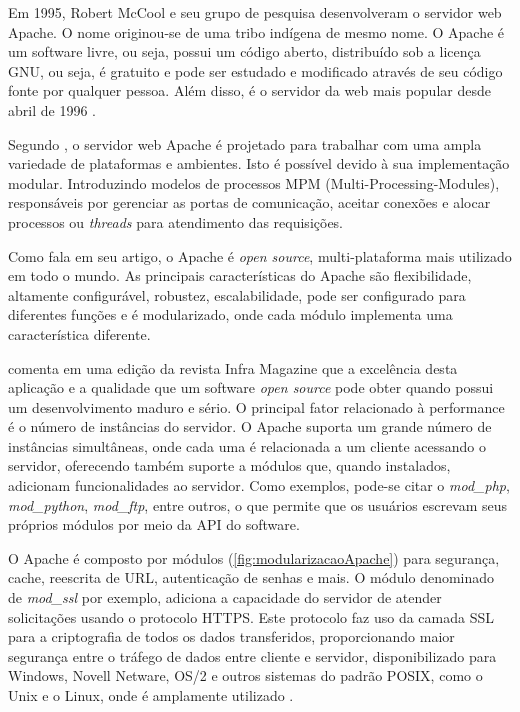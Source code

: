 Em 1995, Robert McCool e seu grupo de pesquisa desenvolveram o servidor web Apache. O nome originou-se de uma tribo indígena de mesmo nome. O Apache é um software livre, ou seja, possui um código aberto, distribuído sob a licença GNU, ou seja, é gratuito e pode ser estudado e modificado através de seu código fonte por qualquer pessoa. Além disso, é o servidor da web mais popular desde abril de 1996 \cite{netcraft}.

Segundo , o servidor web Apache é projetado para trabalhar com uma ampla variedade de plataformas e ambientes. Isto é possível devido à sua implementação  modular. Introduzindo modelos de processos MPM (Multi-Processing-Modules), responsáveis por gerenciar as portas de comunicação, aceitar conexões e alocar processos ou \textit{threads} para atendimento das requisições.

Como  fala em seu artigo, o Apache é \textit{open source}, multi-plataforma mais utilizado em todo o mundo. As principais características do Apache são flexibilidade, altamente configurável, robustez, escalabilidade, pode ser configurado para diferentes funções e é modularizado, onde cada módulo implementa uma característica diferente.

 comenta em uma edição da revista Infra Magazine que a excelência desta aplicação e a qualidade que um software \textit{open source} pode obter quando possui um desenvolvimento maduro e sério. O principal fator relacionado à performance é o número de instâncias do servidor. O Apache suporta um grande número de instâncias simultâneas, onde cada uma é relacionada a um cliente acessando o servidor, oferecendo também suporte a módulos que, quando instalados, adicionam funcionalidades ao servidor. Como exemplos, pode-se citar o \textit{mod\_php}, \textit{mod\_python}, \textit{mod\_ftp}, entre outros, o que permite que os usuários escrevam seus próprios módulos por meio da API do software.

O Apache é composto por módulos (\autoref{fig:modularizacaoApache}) para segurança, cache, reescrita de URL, autenticação de senhas e mais. O módulo denominado de \textit{mod\_ssl} por exemplo, adiciona a capacidade do servidor de atender solicitações usando o protocolo HTTPS. Este protocolo faz uso da camada SSL para a criptografia de todos os dados transferidos, proporcionando maior segurança entre o tráfego de dados entre cliente e servidor,  disponibilizado para Windows, Novell Netware, OS/2 e outros sistemas do padrão POSIX, como o Unix e o Linux, onde é amplamente utilizado \cite{apache:magazine}.

